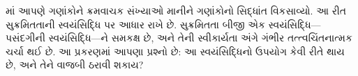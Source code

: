 \documentclass[../../../include/open-logic-section]{subfiles}
\begin{document}


માં આપણે
ગણાંકોને ક્રમવાચક સંખ્યાઓ માનીને ગણાંકોનો સિદ્ધાંત
વિકસાવ્યો. આ રીત સુક્રમિતતાની સ્વયંસિદ્ધિ પર આધાર
રાખે છે. સુક્રમિતતા બીજી એક સ્વયંસિદ્ધિ---પસંદગીની
સ્વયંસિદ્ધિ---ને સમકક્ષ છે, અને તેની સ્વીકાર્યતા અંગે
ગંભીર તત્ત્વચિંતનાત્મક ચર્ચા થઈ છે. આ પ્રકરણમાં આપણા
પ્રશ્નો છે: આ સ્વયંસિદ્ધિનો ઉપયોગ કેવી રીતે થાય છે,
અને તેને વાજબી ઠરાવી શકાય?
\end{document}

